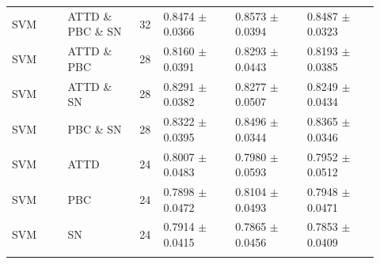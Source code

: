 \documentclass[10pt,a4paper]{article}
\renewcommand{\arraystretch}{1.10}
\newcommand{\classifiersep}{\addlinespace[1pt]\midrule\addlinespace[1pt]}
\begin{document}
\begin{landscape}
\begin{longtable}{@{}L{0.14\linewidth}L{0.18\linewidth}C{0.06\linewidth}C{0.18\linewidth}C{0.18\linewidth}C{0.18\linewidth}@{}}
\classifiersep
SVM & ATTD \& PBC \& SN & 32 & 0.8474 $\pm$ 0.0366 & 0.8573 $\pm$ 0.0394 & 0.8487 $\pm$ 0.0323 \\
SVM & ATTD \& PBC & 28 & 0.8160 $\pm$ 0.0391 & 0.8293 $\pm$ 0.0443 & 0.8193 $\pm$ 0.0385 \\
SVM & ATTD \& SN & 28 & 0.8291 $\pm$ 0.0382 & 0.8277 $\pm$ 0.0507 & 0.8249 $\pm$ 0.0434 \\
SVM & PBC \& SN & 28 & 0.8322 $\pm$ 0.0395 & 0.8496 $\pm$ 0.0344 & 0.8365 $\pm$ 0.0346 \\
SVM & ATTD & 24 & 0.8007 $\pm$ 0.0483 & 0.7980 $\pm$ 0.0593 & 0.7952 $\pm$ 0.0512 \\
SVM & PBC & 24 & 0.7898 $\pm$ 0.0472 & 0.8104 $\pm$ 0.0493 & 0.7948 $\pm$ 0.0471 \\
SVM & SN & 24 & 0.7914 $\pm$ 0.0415 & 0.7865 $\pm$ 0.0456 & 0.7853 $\pm$ 0.0409 \\
\classifiersep
\end{longtable}
\end{landscape}
\normalsize
\renewcommand{\arraystretch}{1.10}
\end{document}
